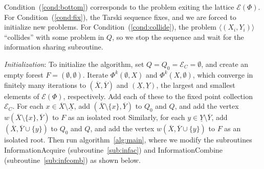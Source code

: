 \documentclass[11pt,reqno]{amsart}
\theoremstyle{definition}
\numberwithin{equation}{section}
\newcommand{\ol}{\overline}
\newcommand{\ul}{\underline}
\newcommand{\lag}{\langle}
\newcommand{\rag}{\rangle}
\newcommand{\fix}{\mathcal{E}}
\newcommand{\acto}{Q_0}
\newcommand{\act}{Q}
\newcommand{\forest}{F}
\newcommand{\fixfind}{\mathcal{E}_C}
\newcommand{\topx}{\ol{X}}
\newcommand{\topy}{\ol{Y}}
\newcommand{\botx}{\ul{X}}
\newcommand{\boty}{\ul{Y}}
\begin{document}
Condition~(\ref{cond:bottom}) corresponds to the problem exiting the lattice $\fix(\Phi)$. 
For Condition~(\ref{cond:fix}), the Tarski sequence fixes, and we are forced to initialize new problems.
For Condition~(\ref{cond:collide}), the problem $\lag (X_i, Y_i) \rag$ ``collides'' with some problem in $\act$, so we stop the sequence and wait for the information sharing subroutine.

\emph{Initialization}: To initialize the algorithm, set $\act = \acto = \fixfind = \emptyset$, and create an empty forest $\forest = (\emptyset,\emptyset)$.
Iterate $\Phi^k(\emptyset,X)$ and $\Phi^k(X, \emptyset)$, which converge in finitely many iterations to $(\topx, \topy)$ and $(\botx,\boty)$, the largest and smallest elements of $\fix(\Phi)$, respectively.
Add each of these to the fixed point collection $\fixfind$.
For each $x \in \topx \setminus \botx$, add $(\topx \setminus \{x\}, \topy)$ to $\acto$ and $\act$, and add the vertex $w(\topx \setminus \{x\}, \topy)$ to $\forest$ as an isolated root
Similarly, for each $y \in \boty \setminus \topy$, add $(\topx, \topy \cup \{y\})$ to $\acto$ and $\act$, and add the vertex $w(\topx, \topy \cup \{y\})$ to $\forest$ as an isolated root.
Then run algorithm~\ref{alg:main}, where we modify the subroutines InformationAcquire (subroutine~\ref{sub:infac}) and InformationCombine (subroutine~\ref{sub:infcomb}) as shown below.
\end{document}

